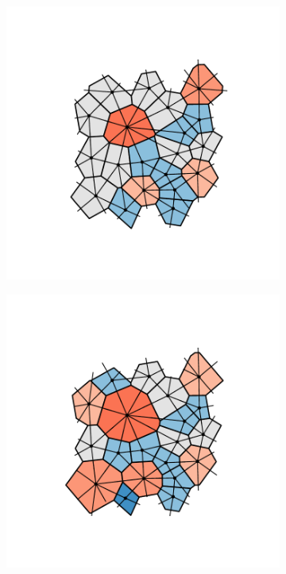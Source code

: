 \begin{figure}[bt]
\begin{subfigure}[b]{0.22\textwidth}
         \caption{}
         \label{fig:vorodemor1}
     \end{subfigure}
     \hfill
     \begin{subfigure}[b]{0.22\textwidth}
         \centering
         \includegraphics[width=\textwidth]{./figures/methods/voro_demo_vcd.pdf}
         \caption{}
         \label{fig:vorodemov2}
     \end{subfigure}
     \hfill
       \begin{subfigure}[b]{0.22\textwidth}
         \centering
         \includegraphics[width=\textwidth]{./figures/methods/voro_demo_rcd.pdf}
         \caption{}
         \label{fig:vorodemor2}
     \end{subfigure}
   

\end{figure}
